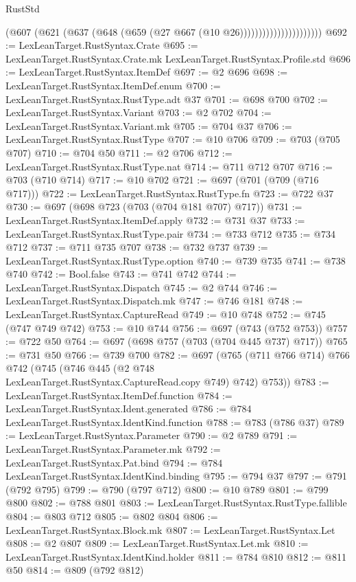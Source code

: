\begin{lexlean}{RustStd}
\begin{coremodule}
                                  (@607
                                    (@621 (@637 (@648 (@659 (@27 @667 (@10 @26))))))))))))))))))))))
@692 := LexLeanTarget.RustSyntax.Crate
@695 := LexLeanTarget.RustSyntax.Crate.mk LexLeanTarget.RustSyntax.Profile.std
@696 := LexLeanTarget.RustSyntax.ItemDef
@697 := @2 @696
@698 := LexLeanTarget.RustSyntax.ItemDef.enum
@700 := LexLeanTarget.RustSyntax.RustType.adt @37
@701 := @698 @700
@702 := LexLeanTarget.RustSyntax.Variant
@703 := @2 @702
@704 := LexLeanTarget.RustSyntax.Variant.mk
@705 := @704 @37
@706 := LexLeanTarget.RustSyntax.RustType
@707 := @10 @706
@709 := @703 (@705 @707)
@710 := @704 @50
@711 := @2 @706
@712 := LexLeanTarget.RustSyntax.RustType.nat
@714 := @711 @712 @707
@716 := @703 (@710 @714)
@717 := @10 @702
@721 := @697 (@701 (@709 (@716 @717)))
@722 := LexLeanTarget.RustSyntax.RustType.fn
@723 := @722 @37
@730 := @697 (@698 @723 (@703 (@704 @181 @707) @717))
@731 := LexLeanTarget.RustSyntax.ItemDef.apply
@732 := @731 @37
@733 := LexLeanTarget.RustSyntax.RustType.pair
@734 := @733 @712
@735 := @734 @712
@737 := @711 @735 @707
@738 := @732 @737
@739 := LexLeanTarget.RustSyntax.RustType.option
@740 := @739 @735
@741 := @738 @740
@742 := Bool.false
@743 := @741 @742
@744 := LexLeanTarget.RustSyntax.Dispatch
@745 := @2 @744
@746 := LexLeanTarget.RustSyntax.Dispatch.mk
@747 := @746 @181
@748 := LexLeanTarget.RustSyntax.CaptureRead
@749 := @10 @748
@752 := @745 (@747 @749 @742)
@753 := @10 @744
@756 := @697 (@743 (@752 @753))
@757 := @722 @50
@764 := @697 (@698 @757 (@703 (@704 @445 @737) @717))
@765 := @731 @50
@766 := @739 @700
@782 := @697
    (@765
      (@711 @766 @714)
      @766
      @742
      (@745 (@746 @445 (@2 @748 LexLeanTarget.RustSyntax.CaptureRead.copy @749) @742) @753))
@783 := LexLeanTarget.RustSyntax.ItemDef.function
@784 := LexLeanTarget.RustSyntax.Ident.generated
@786 := @784 LexLeanTarget.RustSyntax.IdentKind.function
@788 := @783 (@786 @37)
@789 := LexLeanTarget.RustSyntax.Parameter
@790 := @2 @789
@791 := LexLeanTarget.RustSyntax.Parameter.mk
@792 := LexLeanTarget.RustSyntax.Pat.bind
@794 := @784 LexLeanTarget.RustSyntax.IdentKind.binding
@795 := @794 @37
@797 := @791 (@792 @795)
@799 := @790 (@797 @712)
@800 := @10 @789
@801 := @799 @800
@802 := @788 @801
@803 := LexLeanTarget.RustSyntax.RustType.fallible
@804 := @803 @712
@805 := @802 @804
@806 := LexLeanTarget.RustSyntax.Block.mk
@807 := LexLeanTarget.RustSyntax.Let
@808 := @2 @807
@809 := LexLeanTarget.RustSyntax.Let.mk
@810 := LexLeanTarget.RustSyntax.IdentKind.holder
@811 := @784 @810
@812 := @811 @50
@814 := @809 (@792 @812)

\end{coremodule}
\end{lexlean}
